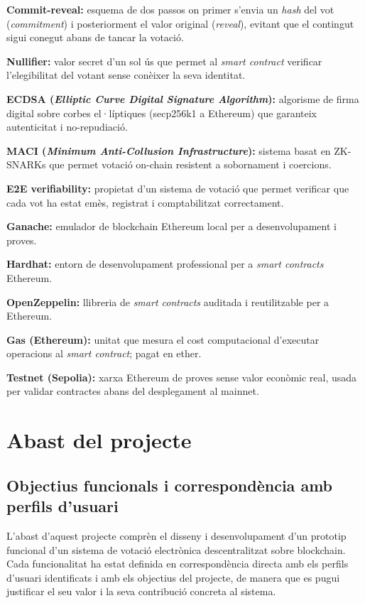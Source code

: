 \documentclass[12pt,a4paper,catalan]{article}
\begin{document}
\textbf{Commit-reveal:} esquema de dos passos on primer s'envia un \textit{hash} del vot (\textit{commitment}) i posteriorment el valor original (\textit{reveal}), evitant que el contingut sigui conegut abans de tancar la votació.

\textbf{Nullifier:} valor secret d'un sol ús que permet al \textit{smart contract} verificar l'elegibilitat del votant sense conèixer la seva identitat.

\textbf{ECDSA (\textit{Elliptic Curve Digital Signature Algorithm}):} algorisme de firma digital sobre corbes el·líptiques (secp256k1 a Ethereum) que garanteix autenticitat i no-repudiació.

\textbf{MACI (\textit{Minimum Anti-Collusion Infrastructure}):} sistema basat en ZK-SNARKs que permet votació on-chain resistent a sobornament i coercions.

\textbf{E2E verifiability:} propietat d'un sistema de votació que permet verificar que cada vot ha estat emès, registrat i comptabilitzat correctament.

\textbf{Ganache:} emulador de blockchain Ethereum local per a desenvolupament i proves.

\textbf{Hardhat:} entorn de desenvolupament professional per a \textit{smart contracts} Ethereum.

\textbf{OpenZeppelin:} llibreria de \textit{smart contracts} auditada i reutilitzable per a Ethereum.

\textbf{Gas (Ethereum):} unitat que mesura el cost computacional d'executar operacions al \textit{smart contract}; pagat en ether.

\textbf{Testnet (Sepolia):} xarxa Ethereum de proves sense valor econòmic real, usada per validar contractes abans del desplegament al mainnet.


\section{Abast del projecte}

\subsection{Objectius funcionals i correspondència amb perfils d'usuari}

L'abast d'aquest projecte comprèn el disseny i desenvolupament d'un prototip funcional d'un sistema de votació electrònica descentralitzat sobre blockchain. Cada funcionalitat ha estat definida en correspondència directa amb els perfils d'usuari identificats i amb els objectius del projecte, de manera que es pugui justificar el seu valor i la seva contribució concreta al sistema.
\end{document}
